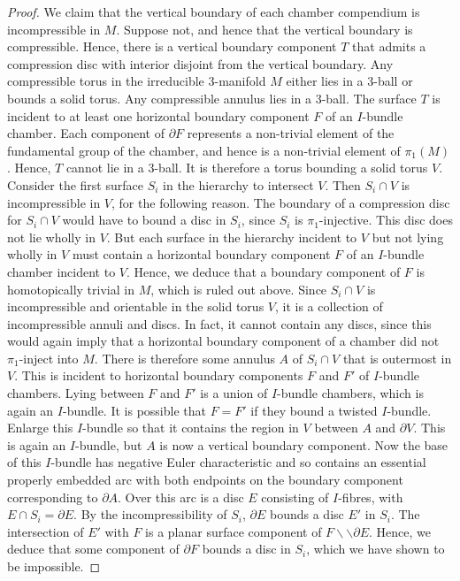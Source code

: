 \documentclass[oneside]{amsart}
\numberwithin{equation}{section}
\theoremstyle{plain}
\theoremstyle{definition}
\newcommand{\cut}{\backslash\backslash}
\begin{document}
\begin{proof}
We claim that the vertical boundary of each chamber compendium is incompressible in $M$. Suppose not, and hence that the vertical boundary is compressible. Hence, there is a vertical boundary component $T$ that admits a compression disc with interior disjoint from the vertical boundary. Any compressible torus in the irreducible 3-manifold $M$ either lies in a 3-ball or bounds a solid torus. Any compressible annulus lies in a 3-ball. The surface $T$ is incident to at least one horizontal boundary component $F$ of an $I$-bundle chamber. Each component of $\partial F$ represents a non-trivial element of the fundamental group of the chamber, and hence is a non-trivial element of $\pi_1(M)$. Hence, $T$ cannot lie in a 3-ball. It is therefore a torus bounding a solid torus $V$. Consider the first surface $S_i$ in the hierarchy to intersect $V$. Then $S_i \cap V$ is incompressible in $V$, for the following reason. The boundary of a compression disc for $S_i \cap V$ would have to bound a disc in $S_i$, since $S_i$ is $\pi_1$-injective. This disc does not lie wholly in $V$. But each surface in the hierarchy incident to $V$ but not lying wholly in $V$ must contain a horizontal boundary component $F$ of an $I$-bundle chamber incident to $V$. Hence, we deduce that a boundary component of $F$ is homotopically trivial in $M$, which is ruled out above. Since $S_i \cap V$ is incompressible and orientable in the solid torus $V$, it is a collection of incompressible annuli and discs. In fact, it cannot contain any discs, since this would again imply that a horizontal boundary component of a chamber did not $\pi_1$-inject into $M$. There is therefore some annulus $A$ of $S_i \cap V$ that is outermost in $V$. This is incident to horizontal boundary components $F$ and $F'$ of $I$-bundle chambers. Lying between $F$ and $F'$ is a union of $I$-bundle chambers, which is again an $I$-bundle. It is possible that $F = F'$ if they bound a twisted $I$-bundle. Enlarge this $I$-bundle so that it contains
the region in $V$ between $A$ and $\partial V$. This is again an $I$-bundle, but $A$ is now a vertical boundary component. Now the base of this $I$-bundle has negative Euler characteristic and so contains an essential properly embedded arc with both endpoints on the boundary component corresponding to $\partial A$. Over this arc is a disc $E$ consisting of $I$-fibres, with $E \cap S_i = \partial E$. By the incompressibility of $S_i$, $\partial E$ bounds a disc $E'$ in $S_i$. The intersection of $E'$ with $F$ is a planar surface component of $F \cut \partial E$. Hence, we deduce that some component of $\partial F$ bounds a disc in $S_i$, which we have shown to be impossible.


\end{proof}
\end{document}
